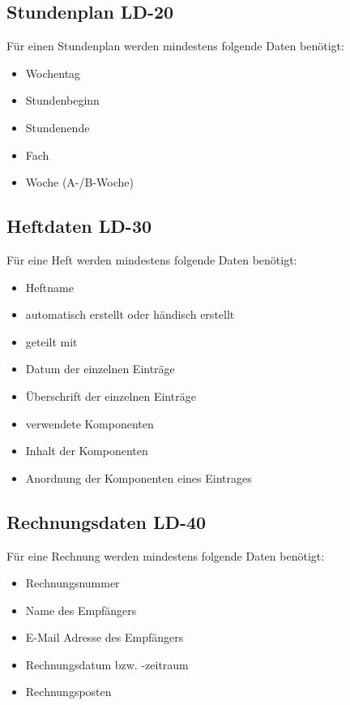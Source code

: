 \documentclass[12pt,a4paper,oneside,ngerman]{scrartcl}
\begin{document}
\subsection[Stundenplan]{Stundenplan \hfill LD-20}
Für einen Stundenplan werden mindestens folgende Daten benötigt:
\begin{itemize}
\item Wochentag
\item Stundenbeginn
\item Stundenende
\item Fach
\item Woche (A-/B-Woche)
\end{itemize}

\subsection[Heftdaten]{Heftdaten \hfill LD-30}
Für eine Heft werden mindestens folgende Daten benötigt:
\begin{itemize}
\item Heftname
\item automatisch erstellt oder händisch erstellt
\item geteilt mit
\item Datum der einzelnen Einträge
\item Überschrift der einzelnen Einträge
\item verwendete Komponenten
\item Inhalt der Komponenten
\item Anordnung der Komponenten eines Eintrages
\end{itemize}

\subsection[Rechnungsdaten]{Rechnungsdaten \hfill LD-40}
Für eine Rechnung werden mindestens folgende Daten benötigt:
\begin{itemize}
\item Rechnungsnummer
\item Name des Empfängers
\item E-Mail Adresse des Empfängers
\item Rechnungsdatum bzw. -zeitraum
\item Rechnungsposten
\end{itemize}

\end{document}
